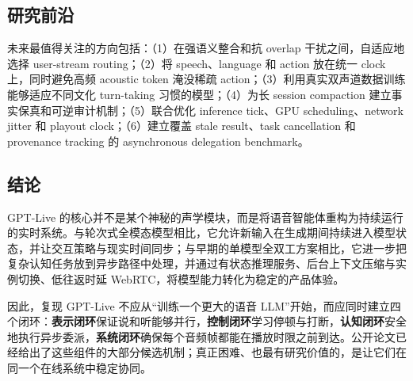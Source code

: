 \documentclass[UTF8,fontset=none,a4paper,10pt]{ctexart}
\begin{document}
\subsection{研究前沿}

未来最值得关注的方向包括：（1）在强语义整合和抗 overlap 干扰之间，自适应地选择 user-stream routing；（2）将 speech、language 和 action 放在统一 clock 上，同时避免高频 acoustic token 淹没稀疏 action；（3）利用真实双声道数据训练能够适应不同文化 turn-taking 习惯的模型；（4）为长 session compaction 建立事实保真和可逆审计机制；（5）联合优化 inference tick、GPU scheduling、network jitter 和 playout clock；（6）建立覆盖 stale result、task cancellation 和 provenance tracking 的 asynchronous delegation benchmark。

\subsection{结论}

GPT-Live 的核心并不是某个神秘的声学模块，而是将语音智能体重构为持续运行的实时系统。与轮次式全模态模型相比，它允许新输入在生成期间持续进入模型状态，并让交互策略与现实时间同步；与早期的单模型全双工方案相比，它进一步把复杂认知任务放到异步路径中处理，并通过有状态推理服务、后台上下文压缩与实例切换、低往返时延 WebRTC，将模型能力转化为稳定的产品体验。

因此，复现 GPT-Live 不应从“训练一个更大的语音 LLM”开始，而应同时建立四个闭环：\textbf{表示闭环}保证说和听能够并行，\textbf{控制闭环}学习停顿与打断，\textbf{认知闭环}安全地执行异步委派，\textbf{系统闭环}确保每个音频帧都能在播放时限之前到达。公开论文已经给出了这些组件的大部分候选机制；真正困难、也最有研究价值的，是让它们在同一个在线系统中稳定协同。
\end{document}
